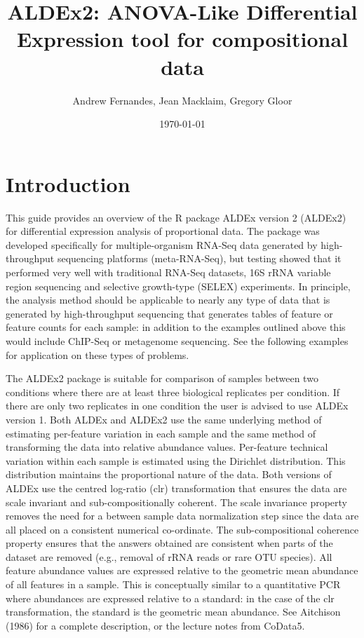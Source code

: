 \documentclass[11pt]{amsart}
\title{ALDEx2: ANOVA-Like Differential Expression tool for compositional data}
\author{Andrew Fernandes, Jean Macklaim, Gregory Gloor}
\date{\today}                                           %
\begin{document}
\maketitle

\section{Introduction}
This guide provides an overview of the R package ALDEx version 2 (ALDEx2) for differential expression analysis of proportional data. The package was developed specifically for multiple-organism RNA-Seq data generated by high-throughput sequencing platforms (meta-RNA-Seq), but testing showed that it performed very well with traditional RNA-Seq datasets, 16S rRNA variable region sequencing and selective growth-type (SELEX) experiments. In principle, the analysis method should be applicable to nearly any type of data that is generated by high-throughput sequencing that generates tables of feature or feature counts for each sample: in addition to the examples outlined above this would include  ChIP-Seq or metagenome sequencing. See the following examples for application on these types of problems.

The ALDEx2 package is suitable for comparison of samples between two conditions where there are at least three biological replicates per condition. If there are only two replicates in one condition the user is advised to use ALDEx version 1. Both ALDEx and ALDEx2 use the same underlying method of estimating per-feature variation in each sample and the same method of transforming the data into relative abundance values. Per-feature technical variation within each sample is estimated using the Dirichlet distribution. This distribution maintains the proportional nature of the data. Both versions of ALDEx use the centred log-ratio (clr) transformation that ensures the data are scale invariant and sub-compositionally coherent\cite{Aitchison:1986}. The scale invariance property removes the need for a between sample data normalization step since the data are all placed on a consistent numerical co-ordinate. The sub-compositional coherence property ensures that the answers obtained are consistent when parts of the dataset are removed (e.g., removal of rRNA reads or rare OTU species). All feature abundance values are expressed relative to the geometric mean abundance of all features in a sample. This is conceptually similar to a quantitative PCR where abundances are expressed relative to a standard: in the case of the clr transformation, the standard is the geometric mean abundance. See Aitchison (1986)\cite{Aitchison:1986} for a complete description, or the lecture notes from CoData5\cite{aitchisonconcise}.
\end{document}
